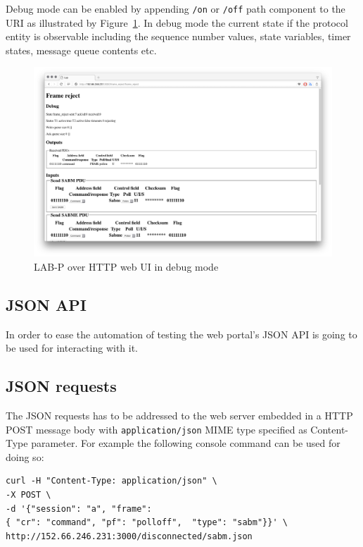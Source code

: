 \documentclass[a4paper]{article}
\begin{document}
Debug mode can be enabled by appending \verb!/on! or \verb!/off! path component to the
URI as illustrated by Figure~\ref{fig:web2}. In debug mode the current state if the protocol entity is observable
including the sequence number values, state variables, timer states, message queue contents etc.

\begin{figure}[!htb]
    \centering
    \includegraphics[width=\textwidth]{figures/web2.png}
    \caption{LAB-P over HTTP web UI in debug mode}
    \label{fig:web2}
\end{figure}

\subsection{JSON API}
In order to ease the automation of testing the web portal's JSON API is going to be used for interacting with it.

\subsection{JSON requests}\label{sec:json_req}

The JSON requests has to be addressed to the web server embedded in a HTTP POST message body with
\verb!application/json! MIME type specified as Content-Type parameter. For example the following console command
can be used for doing so:

\begin{verbatim}
curl -H "Content-Type: application/json" \
-X POST \
-d '{"session": "a", "frame": 
{ "cr": "command", "pf": "polloff",  "type": "sabm"}}' \
http://152.66.246.231:3000/disconnected/sabm.json
\end{verbatim}
\end{document}
